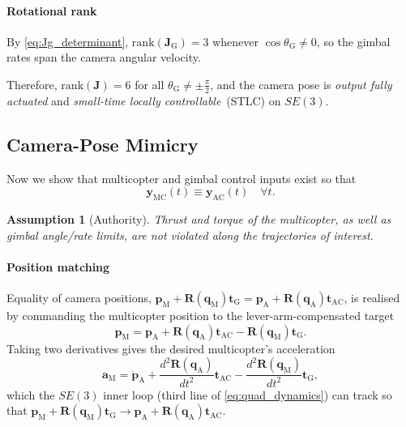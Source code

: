 \documentclass[letterpaper, 10 pt, conference]{ieeeconf}  %
\newtheorem{assumption}{Assumption}
\begin{document}
\paragraph{Rotational rank}
By \eqref{eq:Jg_determinant}, $\mathrm{rank}(\mathbf{J}_\text{G}) = 3$ whenever $\cos\theta_\text{G} \neq 0$, so the gimbal rates span the camera angular velocity.

Therefore, $\mathrm{rank}(\mathbf{J}) = 6$ for all $\theta_\text{G} \neq \pm\frac{\pi}{2}$, and the camera pose is \emph{output fully actuated} and \emph{small-time locally controllable}~(STLC) on $SE(3)$.

\subsection{Camera-Pose Mimicry}
\label{ssec:mimicry}

Now we show that multicopter and gimbal control inputs exist so that 
\begin{equation}
\mathbf{y}_\text{MC}(t) \equiv \mathbf{y}_\text{AC}(t) \quad \forall t.
\end{equation}

\begin{assumption}[Authority]
\label{ass:authority}
Thrust and torque of the multicopter, as well as gimbal angle/rate limits, are not violated along the trajectories of interest.
\end{assumption}

\paragraph{Position matching}
Equality of camera positions, $\mathbf{p}_\text{M} + \mathbf{R}(\mathbf{q}_\text{M})\mathbf{t}_\text{G} = \mathbf{p}_\text{A} + \mathbf{R}(\mathbf{q}_\text{A})\mathbf{t}_\text{AC}$, is realised by commanding the multicopter position to the lever-arm-compensated target
\begin{equation}
\label{eq:pos_cmd_combined}
\mathbf{p}_\text{M} = \mathbf{p}_\text{A} + \mathbf{R}(\mathbf{q}_\text{A})\mathbf{t}_\text{AC} - \mathbf{R}(\mathbf{q}_\text{M})\mathbf{t}_\text{G}.
\end{equation}
Taking two derivatives gives the desired multicopter's acceleration
\begin{equation}
\mathbf{a}_\text{M} = \ddot{\mathbf{p}}_\text{A} + \frac{d^2 \mathbf{R}(\mathbf{q}_\text{A})}{dt^2} \mathbf{t}_\text{AC} - \frac{d^2 \mathbf{R}(\mathbf{q}_\text{M})}{dt^2} \mathbf{t}_\text{G},
\end{equation}
which the $SE(3)$ inner loop (third line of \eqref{eq:quad_dynamics}) can track so that $\mathbf{p}_\text{M} + \mathbf{R}(\mathbf{q}_\text{M})\mathbf{t}_\text{G} \rightarrow \mathbf{p}_\text{A} + \mathbf{R}(\mathbf{q}_\text{A})\mathbf{t}_\text{AC}$.
\end{document}
